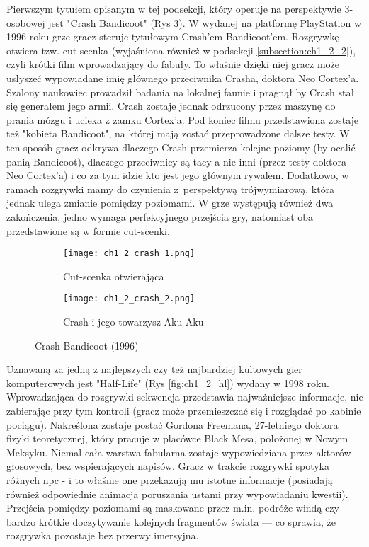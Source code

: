 Pierwszym tytułem opisanym w tej podsekcji, który operuje na perspektywie 3-osobowej jest
"Crash Bandicoot" (Rys \ref{fig:ch1_2_crash}). W wydanej na platformę PlayStation w 1996 roku grze
gracz steruje tytułowym Crash'em Bandicoot'em. Rozgrywkę otwiera tzw. cut-scenka (wyjaśniona również w
podsekcji \ref{subsection:ch1_2_2}), czyli krótki film wprowadzający do fabuły. To właśnie dzięki niej
gracz może usłyszeć wypowiadane imię głównego przeciwnika Crasha, doktora Neo Cortex'a.
Szalony naukowiec prowadził badania na lokalnej faunie i pragnął by Crash
stał się generałem jego armii. Crash zostaje jednak odrzucony przez maszynę do prania mózgu i ucieka
z zamku Cortex'a. Pod koniec filmu przedstawiona zostaje też "kobieta Bandicoot", na której mają zostać
przeprowadzone dalsze testy. W ten sposób gracz odkrywa dlaczego Crash przemierza kolejne poziomy (by ocalić
panią Bandicoot), dlaczego przeciwnicy są tacy a nie inni (przez testy doktora Neo Cortex'a) i co za tym
idzie kto jest jego głównym rywalem. Dodatkowo, w ramach rozgrywki mamy do czynienia z~perspektywą
trójwymiarową, która jednak ulega zmianie pomiędzy poziomami. W grze występują również dwa zakończenia,
jedno wymaga perfekcyjnego przejścia gry, natomiast oba przedstawione są w formie cut-scenki.

\begin{figure}[h]
    \begin{subfigure}{0.49\textwidth}
        \caption{Cut-scenka otwierająca}
        \texttt{[image: ch1\_2\_crash\_1.png]}
        \label{subfig:ch_1_2_crash_1}
    \end{subfigure}
    \begin{subfigure}{0.49\textwidth}
        \caption{Crash i jego towarzysz Aku Aku}
        \texttt{[image: ch1\_2\_crash\_2.png]}
        \label{subfig:ch_1_2_crash_2}
    \end{subfigure}
    \caption{Crash Bandicoot (1996)}
    \label{fig:ch1_2_crash}
\end{figure}

Uznawaną za jedną z najlepszych czy też najbardziej kultowych gier komputerowych jest
"Half-Life" (Rys \ref{fig:ch1_2_hl}) wydany w 1998 roku.
Wprowadzająca do rozgrywki sekwencja przedstawia najważniejsze informacje, nie zabierając
przy tym kontroli (gracz może przemieszczać się i rozglądać po kabinie pociągu). Nakreślona zostaje
postać Gordona Freemana, 27-letniego doktora fizyki teoretycznej, który pracuje w placówce Black Mesa,
położonej w Nowym Meksyku. Niemal cała warstwa fabularna zostaje wypowiedziana przez aktorów głosowych,
bez wspierających napisów. Gracz w trakcie rozgrywki spotyka różnych \gls{npc} - i to właśnie one
przekazują mu istotne informacje (posiadają również odpowiednie animacja poruszania ustami przy
wypowiadaniu kwestii). Przejścia pomiędzy poziomami są maskowane przez m.in. podróże windą czy
bardzo krótkie doczytywanie kolejnych fragmentów świata --- co sprawia, że rozgrywka pozostaje
bez przerwy imersyjna.

